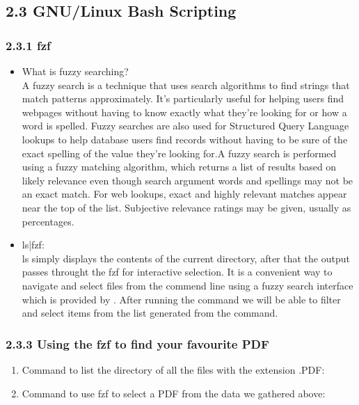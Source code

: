 \documentclass{article}
\begin{document}
\subsection*{\Large 2.3 GNU/Linux Bash Scripting}
\subsubsection*{\large 2.3.1 fzf}
\begin{itemize}
    \item What is fuzzy searching?\\
    A fuzzy search is a technique that uses search algorithms to find strings that match patterns approximately. It's particularly useful for helping users find webpages without having to know exactly what they're looking for or how a word is spelled. Fuzzy searches are also used for Structured Query Language lookups to help database users find records without having to be sure of the exact spelling of the value they're looking for.A fuzzy search is performed using a fuzzy matching algorithm, which returns a list of results based on likely relevance even though search argument words and spellings may not be an exact match. For web lookups, exact and highly relevant matches appear near the top of the list. Subjective relevance ratings may be given, usually as percentages.
    \item ls|fzf:\\
    ls simply displays the contents of the current directory, after that the output passes throught the 
    fzf  for interactive selection. It is a convenient way to navigate and select files from the commend line
    using a fuzzy search interface which is provided by . After running the command we will be able to filter 
    and select items from the list generated from the  command.
\end{itemize}
\subsubsection*{\large 2.3.3 Using the fzf to find your favourite PDF}
\begin{enumerate}
    \item Command to list the directory of all the files with the extension .PDF:\\
    \item Command to use fzf to select a PDF from the data we gathered above:\\
\end{enumerate}
\end{document}
